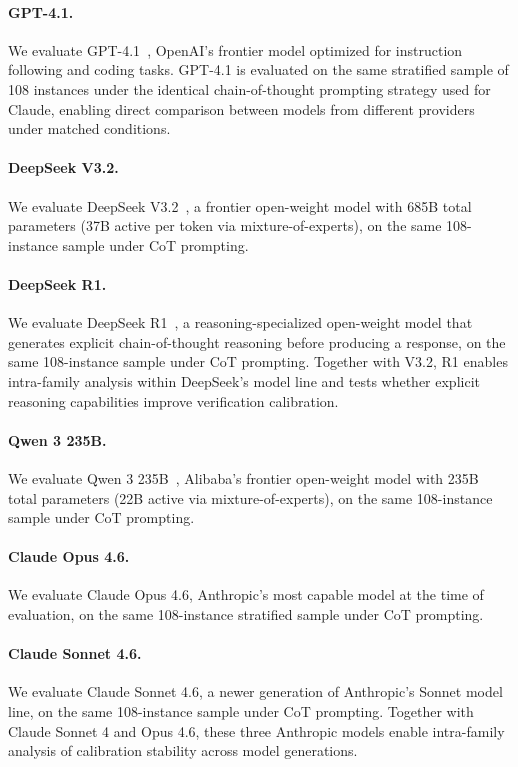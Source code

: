 \documentclass[11pt]{article}
\begin{document}
\paragraph{GPT-4.1.}
We evaluate GPT-4.1~\citep{openai2025gpt41}, OpenAI's frontier model optimized for instruction following and coding tasks.
GPT-4.1 is evaluated on the same stratified sample of 108 instances under the identical chain-of-thought prompting strategy used for Claude, enabling direct comparison between models from different providers under matched conditions.

\paragraph{DeepSeek V3.2.}
We evaluate DeepSeek V3.2~\citep{deepseek2025v3}, a frontier open-weight model with 685B total parameters (37B active per token via mixture-of-experts), on the same 108-instance sample under CoT prompting.

\paragraph{DeepSeek R1.}
We evaluate DeepSeek R1~\citep{deepseek2025v3}, a reasoning-specialized open-weight model that generates explicit chain-of-thought reasoning before producing a response, on the same 108-instance sample under CoT prompting.
Together with V3.2, R1 enables intra-family analysis within DeepSeek's model line and tests whether explicit reasoning capabilities improve verification calibration.

\paragraph{Qwen 3 235B.}
We evaluate Qwen 3 235B~\citep{qwen2025qwen3}, Alibaba's frontier open-weight model with 235B total parameters (22B active via mixture-of-experts), on the same 108-instance sample under CoT prompting.

\paragraph{Claude Opus 4.6.}
We evaluate Claude Opus 4.6, Anthropic's most capable model at the time of evaluation, on the same 108-instance stratified sample under CoT prompting.

\paragraph{Claude Sonnet 4.6.}
We evaluate Claude Sonnet 4.6, a newer generation of Anthropic's Sonnet model line, on the same 108-instance sample under CoT prompting.
Together with Claude Sonnet 4 and Opus 4.6, these three Anthropic models enable intra-family analysis of calibration stability across model generations.
\end{document}

